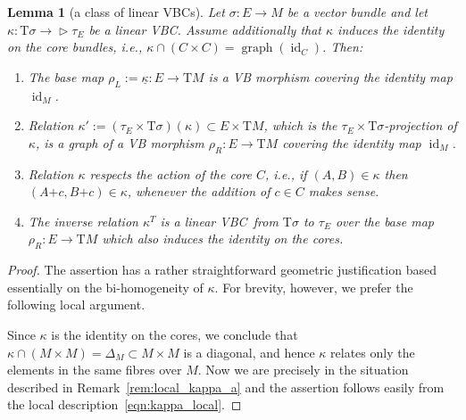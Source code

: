 \documentclass[10pt,a4paper]{amsart}
\newcommand{\ZM}{{VBC}} %
\newcommand{\und}{\underline}
\newcommand{\graf}{\operatorname{graph}}
\newcommand{\id}{\operatorname{id}}
\newcommand{\ra}{\rightarrow}
\newcommand{\plus}{\boldsymbol{\pmb{+}}}
\newcommand{\rhoL}{\rho_L} %
\newcommand{\rhoR}{\rho_R}
\newcommand{\T}{\mathrm{T}} %
\def\relto{\rightarrow\!\!\vartriangleright} %
\numberwithin{equation}{section}
\newtheorem{lem}[thm]{Lemma}
\theoremstyle{definition}
\begin{document}
\begin{lem}[a class of linear \ZM s]\label{lem:kappa_core} Let $\sigma\colon E\ra M$ be a vector bundle and let $\kappa\colon \T\sigma\relto \tau_E$ be a linear \ZM . Assume additionally that $\kappa$ induces the identity on the core bundles, i.e., $\kappa\cap(C\times C)=\graf(\id_C)$. Then:
\begin{enumerate}[$(i)$]\itemsep=0pt
	\item\label{cond:rho_l} The base map $\rhoL:=\und{\kappa}\colon E\ra \T M$ is a VB morphism covering the identity map $\id_M$.
	\item\label{cond:rho_r} Relation $\kappa':=(\tau_E\times\T\sigma)(\kappa)\subset E\times\T M$, which is the $\tau_E\times\T\sigma$-projection of $\kappa$, is a graph of a VB morphism $\rhoR\colon E\ra \T M$ covering the identity map $\id_M$.
	\item\label{cond:core_action} Relation $\kappa$ respects the action of the core $C$, i.e., if $(A,B)\in \kappa$ then
	$(A\plus c,B\plus c)\in\kappa$, whenever the addition of $c\in C$ makes sense.
	\item\label{cond:kappa_inverse} The inverse relation $\kappa^T$ is a linear \ZM\ from $\T\sigma$ to $\tau_E$ over the base map $\rhoR\colon E\ra \T M$ which also induces the identity on the cores.
\end{enumerate}
\end{lem}

\begin{proof}The assertion has a rather straightforward geometric justification based essentially on the bi-homogeneity of $\kappa$. For brevity, however, we prefer the following local argument.

Since $\kappa$ is the identity on the cores, we conclude that $\kappa\cap (M\times M) = \Delta_M\subset M\times M$ is a diagonal, and hence $\kappa$ relates only the elements in the same fibres over $M$. Now we are precisely in the situation described in Remark~\ref{rem:local_kappa_a} and the assertion follows easily from the local description~\eqref{eqn:kappa_local}. \end{proof}
\end{document}
